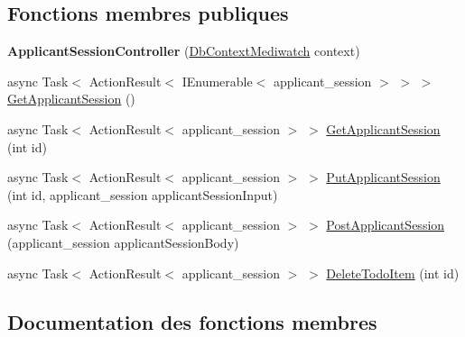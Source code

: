 \subsection*{Fonctions membres publiques}
\begin{DoxyCompactItemize}
\item 
\mbox{\label{class_mediwatch_1_1_server_1_1_controllers_1_1_applicant_session_controller_a25bd4d18e93861e4d99e672b127db48b}} 
{\bfseries Applicant\+Session\+Controller} (\hyperlink{class_server_1_1_db_context_mediwatch}{Db\+Context\+Mediwatch} context)
\item 
async Task$<$ Action\+Result$<$ I\+Enumerable$<$ applicant\+\_\+session $>$ $>$ $>$ \hyperlink{class_mediwatch_1_1_server_1_1_controllers_1_1_applicant_session_controller_adf8d12f5dcaaa4395522c8febae1e735}{Get\+Applicant\+Session} ()
\item 
async Task$<$ Action\+Result$<$ applicant\+\_\+session $>$ $>$ \hyperlink{class_mediwatch_1_1_server_1_1_controllers_1_1_applicant_session_controller_ada65188cced0326a54f824a251869f02}{Get\+Applicant\+Session} (int id)
\item 
async Task$<$ Action\+Result$<$ applicant\+\_\+session $>$ $>$ \hyperlink{class_mediwatch_1_1_server_1_1_controllers_1_1_applicant_session_controller_a9b9428a2f0209f15ef65b1262e220234}{Put\+Applicant\+Session} (int id, applicant\+\_\+session applicant\+Session\+Input)
\item 
async Task$<$ Action\+Result$<$ applicant\+\_\+session $>$ $>$ \hyperlink{class_mediwatch_1_1_server_1_1_controllers_1_1_applicant_session_controller_a58d68c490175d8d0a13aa0104a36aed8}{Post\+Applicant\+Session} (applicant\+\_\+session applicant\+Session\+Body)
\item 
async Task$<$ Action\+Result$<$ applicant\+\_\+session $>$ $>$ \hyperlink{class_mediwatch_1_1_server_1_1_controllers_1_1_applicant_session_controller_af3f0c4921fadd1483d25e39df7d5a857}{Delete\+Todo\+Item} (int id)
\end{DoxyCompactItemize}


\subsection{Documentation des fonctions membres}
\mbox{\label{class_mediwatch_1_1_server_1_1_controllers_1_1_applicant_session_controller_af3f0c4921fadd1483d25e39df7d5a857}} 
